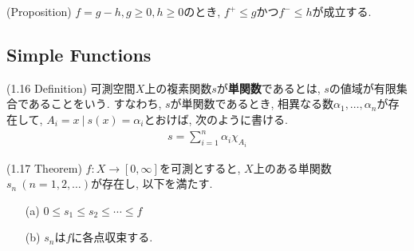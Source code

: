 \documentclass[a4paper]{jsarticle}
\begin{document}
\begin{prop}{(Proposition)}{}
    $f=g-h, g\geq 0, h\geq 0$のとき, $f^+\leq g$かつ$f^-\leq h$が成立する.
\end{prop}

\subsection{Simple Functions}
\begin{defi}{(1.16 Definition)}{}
    可測空間$X$上の複素関数$s$が{\bf 単関数}であるとは, $s$の値域が有限集合であることをいう. すなわち, $s$が単関数であるとき, 相異なる数$\alpha_1, \dots, \alpha_n$が存在して, $A_i ={x \ | \ s(x)=\alpha_i}$とおけば, 次のように書ける.
    \begin{align*}
        s = \sum_{i=1}^n \alpha_i \chi_{A_i}
    \end{align*}
\end{defi}
\begin{thm}{(1.17 Theorem)}{}
    $f:X\to [0, \infty]$を可測とすると, $X$上のある単関数$s_n \ (n=1, 2, \dots)$が存在し, 以下を満たす.
    \begin{enumerate}
        \item[(a)] $0\leq s_1\leq s_2 \leq \cdots\leq f$
        \item[(b)] $s_n$は$f$に各点収束する.
    \end{enumerate}
\end{thm}
\end{document}
